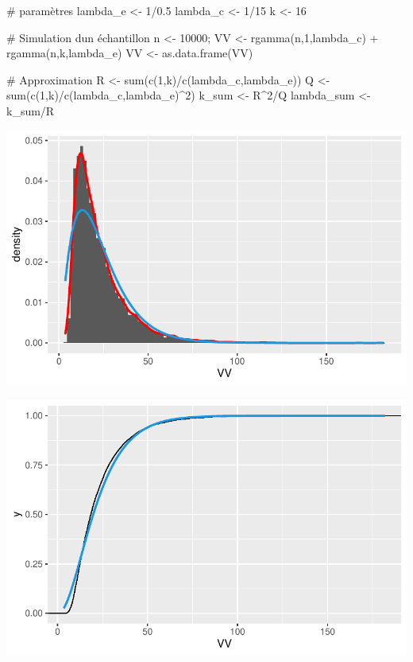 \documentclass[
  letterpaper,
  DIV=11,
  numbers=noendperiod]{scrartcl}
\newenvironment{Shaded}{\begin{snugshade}}{\end{snugshade}}
\newcommand{\CommentTok}[1]{\textcolor[rgb]{0.37,0.37,0.37}{#1}}
\newcommand{\DecValTok}[1]{\textcolor[rgb]{0.68,0.00,0.00}{#1}}
\newcommand{\FloatTok}[1]{\textcolor[rgb]{0.68,0.00,0.00}{#1}}
\newcommand{\FunctionTok}[1]{\textcolor[rgb]{0.28,0.35,0.67}{#1}}
\newcommand{\NormalTok}[1]{\textcolor[rgb]{0.00,0.23,0.31}{#1}}
\newcommand{\OtherTok}[1]{\textcolor[rgb]{0.00,0.23,0.31}{#1}}
\newcommand{\SpecialCharTok}[1]{\textcolor[rgb]{0.37,0.37,0.37}{#1}}
\begin{document}
\begin{Shaded}
\begin{Highlighting}[]
\CommentTok{\# paramètres }
\NormalTok{lambda\_e }\OtherTok{\textless{}{-}} \DecValTok{1}\SpecialCharTok{/}\FloatTok{0.5}
\NormalTok{lambda\_c }\OtherTok{\textless{}{-}} \DecValTok{1}\SpecialCharTok{/}\DecValTok{15}
\NormalTok{k }\OtherTok{\textless{}{-}} \DecValTok{16}

\CommentTok{\# Simulation d\textquotesingle{}un échantillon}
\NormalTok{n }\OtherTok{\textless{}{-}} \DecValTok{10000}\NormalTok{;}
\NormalTok{VV }\OtherTok{\textless{}{-}} \FunctionTok{rgamma}\NormalTok{(n,}\DecValTok{1}\NormalTok{,lambda\_c) }\SpecialCharTok{+} \FunctionTok{rgamma}\NormalTok{(n,k,lambda\_e)}
\NormalTok{VV }\OtherTok{\textless{}{-}} \FunctionTok{as.data.frame}\NormalTok{(VV)}

\CommentTok{\# Approximation}
\NormalTok{R }\OtherTok{\textless{}{-}} \FunctionTok{sum}\NormalTok{(}\FunctionTok{c}\NormalTok{(}\DecValTok{1}\NormalTok{,k)}\SpecialCharTok{/}\FunctionTok{c}\NormalTok{(lambda\_c,lambda\_e))}
\NormalTok{Q }\OtherTok{\textless{}{-}} \FunctionTok{sum}\NormalTok{(}\FunctionTok{c}\NormalTok{(}\DecValTok{1}\NormalTok{,k)}\SpecialCharTok{/}\FunctionTok{c}\NormalTok{(lambda\_c,lambda\_e)}\SpecialCharTok{\^{}}\DecValTok{2}\NormalTok{)}
\NormalTok{k\_sum }\OtherTok{\textless{}{-}}\NormalTok{ R}\SpecialCharTok{\^{}}\DecValTok{2}\SpecialCharTok{/}\NormalTok{Q}
\NormalTok{lambda\_sum }\OtherTok{\textless{}{-}}\NormalTok{ k\_sum}\SpecialCharTok{/}\NormalTok{R}
\end{Highlighting}
\end{Shaded}

\includegraphics{Cinetique_Proteines_files/figure-pdf/approx density-1.pdf}

\includegraphics{Cinetique_Proteines_files/figure-pdf/approx repat-1.pdf}
\end{document}
